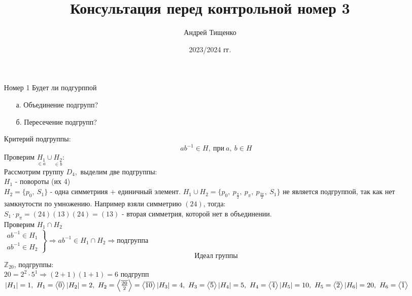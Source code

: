 \documentclass[12pt, letterpaper, twoside]{article}
\title{Консультация перед контрольной номер 3}
\author{Андрей Тищенко}
\date{2023/2024 гг.}
\begin{document}
    \maketitle
    \begin{enumerate}
        \item[Номер 1] Будет ли подгурппой
        \begin{enumerate}
            \item[а.] Объединение подгрупп?
            \item[б.] Пересечение подгрупп? 
        \end{enumerate}
        Критерий подгруппы:
        \[ab^{-1} \in H,\ \text{при}\ a,\ b\in H\]
        Проверим $\underset{\in a}{H_1} \cup \underset{\in b}{H_2}$:\\
        Рассмотрим группу $D_4$,\ выделим две подгруппы:\\
        $H_1$ - повороты (их 4)\\
        $H_2 = \{p_0,\ S_1\}$ - одна симметриия + единичный элемент.
        $H_1 \cup H_2 = \{p_0,\ p_{\frac{\pi}{2}},\ p_{\pi},\ p_{\frac{3\pi}{2}},\ S_1\}$ не является подгруппой, так как нет замкнутости по умножению. Например взяли симметрию $(24)$, тогда:\\
        $S_1 \cdot p_{\pi} = (24)(13)(24) = (13)$ - вторая симметрия, которой нет в объединении.\\
        Проверим $H_1 \cap H_2$\\
        $\left. \begin{matrix} 
            ab^{-1} \in H_1\\
            ab^{-1} \in H_2    
        \end{matrix}\right\} \Rightarrow ab^{-1} \in H_1\cap H_2\Rightarrow \text{подгруппа}$
        \[\text{Идеал группы}\]
        $\mathbb{Z}_{20}$, подгруппы:\\
        $20 = 2^2 \cdot 5^1 \Rightarrow (2 + 1)(1 + 1) = 6$ подгрупп\\
        $|H_1| = 1,\ H_1 = \left<\overline{0}\right>\\
        |H_2| = 2,\ H_2 = \left<\overline{\frac{20}{2}}\right> = \left<\overline{10}\right>\\
        |H_3| = 4,\ H_3 = \left<\overline{5}\right>\\
        |H_4| = 5,\ H_4 = \left<\overline{4}\right>\\
        |H_5| = 10,\ H_5 = \left<\overline{2}\right>\\
        |H_6| = 20,\ H_6 = \left<\overline{1}\right>$\\

\end{enumerate}
\end{document}
